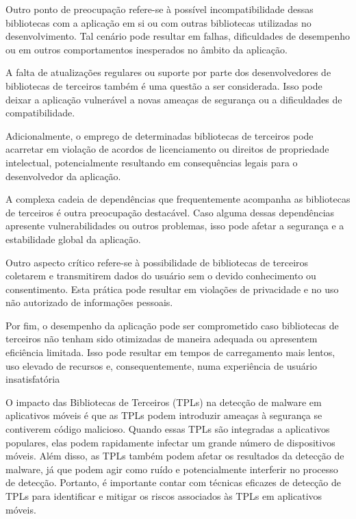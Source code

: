 Outro ponto de preocupação refere-se à possível incompatibilidade dessas bibliotecas com a aplicação em si ou com outras bibliotecas utilizadas no desenvolvimento. Tal cenário pode resultar em falhas, dificuldades de desempenho ou em outros comportamentos inesperados no âmbito da aplicação.

A falta de atualizações regulares ou suporte por parte dos desenvolvedores de bibliotecas de terceiros também é uma questão a ser considerada. Isso pode deixar a aplicação vulnerável a novas ameaças de segurança ou a dificuldades de compatibilidade.

Adicionalmente, o emprego de determinadas bibliotecas de terceiros pode acarretar em violação de acordos de licenciamento ou direitos de propriedade intelectual, potencialmente resultando em consequências legais para o desenvolvedor da aplicação.

A complexa cadeia de dependências que frequentemente acompanha as bibliotecas de terceiros é outra preocupação destacável. Caso alguma dessas dependências apresente vulnerabilidades ou outros problemas, isso pode afetar a segurança e a estabilidade global da aplicação.

Outro aspecto crítico refere-se à possibilidade de bibliotecas de terceiros coletarem e transmitirem dados do usuário sem o devido conhecimento ou consentimento. Esta prática pode resultar em violações de privacidade e no uso não autorizado de informações pessoais.

Por fim, o desempenho da aplicação pode ser comprometido caso bibliotecas de terceiros não tenham sido otimizadas de maneira adequada ou apresentem eficiência limitada. Isso pode resultar em tempos de carregamento mais lentos, uso elevado de recursos e, consequentemente, numa experiência de usuário insatisfatória



O impacto das Bibliotecas de Terceiros (TPLs) na detecção de malware em aplicativos móveis é que as TPLs podem introduzir ameaças à segurança se contiverem código malicioso. Quando essas TPLs são integradas a aplicativos populares, elas podem rapidamente infectar um grande número de dispositivos móveis. Além disso, as TPLs também podem afetar os resultados da detecção de malware, já que podem agir como ruído e potencialmente interferir no processo de detecção. Portanto, é importante contar com técnicas eficazes de detecção de TPLs para identificar e mitigar os riscos associados às TPLs em aplicativos móveis.

